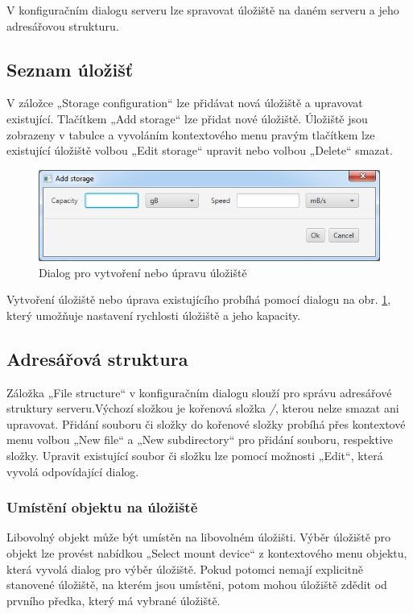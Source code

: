 \documentclass[czech,DP]{thesiskiv}
\begin{document}
V konfiguračním dialogu serveru lze spravovat úložiště na daném serveru a jeho adresářovou strukturu.

\subsection{Seznam úložišť}

V záložce „Storage configuration“ lze přidávat nová úložiště a upravovat existující. Tlačítkem „Add storage“ lze přidat nové úložiště. Úložiště jsou zobrazeny v tabulce a vyvoláním kontextového menu pravým tlačítkem lze existující úložiště volbou „Edit storage“ upravit nebo volbou „Delete“ smazat. 

\begin{figure}
\centering
	\includegraphics[width=\textwidth]{img/prirucka/uloziste_dialog.png}
\caption{Dialog pro vytvoření nebo úpravu úložiště}
\label{fig:p_uloziste_dialog}
\end{figure}

Vytvoření úložiště nebo úprava existujícího probíhá pomocí dialogu na obr. \ref{fig:p_uloziste_dialog}, který umožňuje nastavení rychlosti úložiště a jeho kapacity.

\subsection{Adresářová struktura}

Záložka „File structure“ v konfiguračním dialogu slouží pro správu adresářové struktury serveru.Výchozí složkou je kořenová složka \textit{/}, kterou nelze smazat ani upravovat. Přidání souboru či složky do kořenové složky probíhá přes kontextové menu volbou „New file“ a „New subdirectory“ pro přidání souboru, respektive složky. Upravit existující soubor či složku lze pomocí možnosti „Edit“, která vyvolá odpovídající dialog.

\subsubsection*{Umístění objektu na úložiště}

Libovolný objekt může být umístěn na libovolném úložišti. Výběr úložiště pro objekt lze provést nabídkou „Select mount device“ z kontextového menu objektu, která vyvolá dialog pro výběr úložiště. Pokud potomci nemají explicitně stanovené úložiště, na kterém jsou umístěni, potom mohou úložiště zdědit od prvního předka, který má vybrané úložiště.
\end{document}
